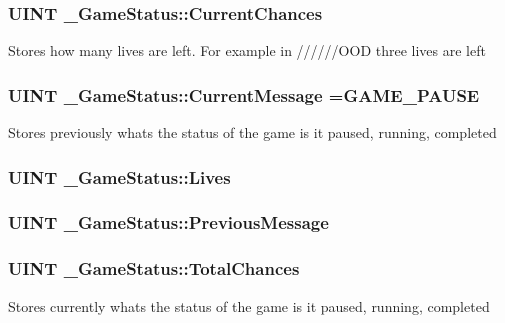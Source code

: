 \subsubsection[{Current\+Chances}]{\setlength{\rightskip}{0pt plus 5cm}U\+I\+N\+T \+\_\+\+Game\+Status\+::\+Current\+Chances}\label{struct___game_status_a0b8840bf3ddfec74a158673707a1637e}
Stores how many lives are left. For example in //////\+O\+O\+D three lives are left \hypertarget{struct___game_status_a9ade8a83aa345c9b51695aab6ed240d2}{}
\subsubsection[{Current\+Message}]{\setlength{\rightskip}{0pt plus 5cm}U\+I\+N\+T \+\_\+\+Game\+Status\+::\+Current\+Message ={\bf G\+A\+M\+E\+\_\+\+P\+A\+U\+S\+E}}\label{struct___game_status_a9ade8a83aa345c9b51695aab6ed240d2}
Stores previously what\textquotesingle{}s the status of the game is it paused, running, completed \hypertarget{struct___game_status_acbd5c161cfd6431a030841511febaeb7}{}
\subsubsection[{Lives}]{\setlength{\rightskip}{0pt plus 5cm}U\+I\+N\+T \+\_\+\+Game\+Status\+::\+Lives}\label{struct___game_status_acbd5c161cfd6431a030841511febaeb7}
\hypertarget{struct___game_status_a417bbdfd4ab8e689e76f3884bddbe3c2}{}
\subsubsection[{Previous\+Message}]{\setlength{\rightskip}{0pt plus 5cm}U\+I\+N\+T \+\_\+\+Game\+Status\+::\+Previous\+Message}\label{struct___game_status_a417bbdfd4ab8e689e76f3884bddbe3c2}
\hypertarget{struct___game_status_a67b0d0d85dfe00b0f62ab90c24eec292}{}
\subsubsection[{Total\+Chances}]{\setlength{\rightskip}{0pt plus 5cm}U\+I\+N\+T \+\_\+\+Game\+Status\+::\+Total\+Chances}\label{struct___game_status_a67b0d0d85dfe00b0f62ab90c24eec292}
Stores currently what\textquotesingle{}s the status of the game is it paused, running, completed 

